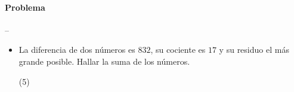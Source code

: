 \documentclass[12pt, a4paper]{article}
\begin{document}
\paragraph*{Problema} -- \\
\begin{itemize}
\item{La diferencia de dos números es $832$, su cociente es $17$ y su residuo el más grande posible. Hallar la suma de los números.
	\begin{tasks}(5)
	\end{tasks}
}
\end{itemize}
\end{document}
